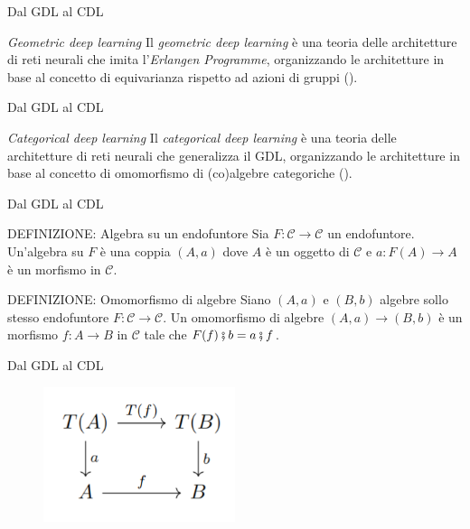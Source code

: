 \documentclass{beamer}
\begin{document}
\begin{frame}{Dal GDL al CDL}
    \begin{block}{\textit{Geometric deep learning}}
        Il \textit{geometric deep learning} è una teoria delle architetture di reti neurali che imita l'\textit{Erlangen Programme}, organizzando le architetture in base al concetto di equivarianza rispetto ad azioni di gruppi (\cite{bronstein2021geometric}).
    \end{block}
\end{frame}

\begin{frame}{Dal GDL al CDL}
    \begin{block}{\textit{Categorical deep learning}}
        Il \textit{categorical deep learning} è una teoria delle architetture di reti neurali che generalizza il GDL, organizzando le architetture in base al concetto di omomorfismo di (co)algebre categoriche (\cite{gavranovicposition}).
    \end{block}
\end{frame}


\begin{frame}{Dal GDL al CDL}
    \begin{block}{DEFINIZIONE: Algebra su un endofuntore}
        Sia $F: \mathcal{C} \to \mathcal{C}$ un endofuntore. Un'algebra su $F$ è una coppia $(A,a)$ dove $A$ è un oggetto di $\mathcal{C}$ e $a: F(A) \to A$ è un morfismo in $\mathcal{C}$.
    \end{block}

    \begin{block}{DEFINIZIONE: Omomorfismo di algebre}
        Siano $(A,a)$ e $(B,b)$ algebre sollo stesso endofuntore $F: \mathcal{C} \to \mathcal{C}$. Un omomorfismo di algebre $(A,a) \to (B,b)$ è un morfismo $f: A \to B$ in $\mathcal{C}$ tale che $F(f) \fatsemi b =  a \fatsemi f$.
    \end{block}
\end{frame}

\begin{frame}{Dal GDL al CDL}
    \begin{figure}
        \begin{center}
            \includegraphics[width=0.5\textwidth]{figures/algebra_hom.png}
            \caption*{}
        \end{center}
    \end{figure}
\end{frame}
\end{document}
